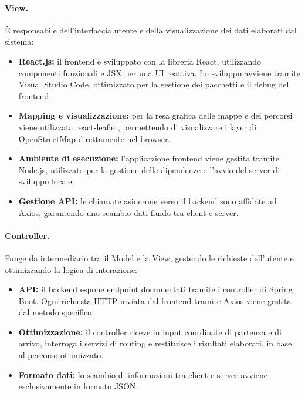 \paragraph*{\textbf{View.}} È responsabile dell'interfaccia utente e della visualizzazione dei dati elaborati dal sistema:

\begin{itemize}
    \item \textbf{React.js:} il frontend è sviluppato con la libreria React, utilizzando componenti funzionali e JSX per una UI reattiva. Lo sviluppo avviene tramite Visual Studio Code, ottimizzato per la gestione dei pacchetti e il debug del frontend.
    \item \textbf{Mapping e visualizzazione:} per la resa grafica delle mappe e dei percorsi viene utilizzata react-leaflet, permettendo di visualizzare i layer di OpenStreetMap direttamente nel browser.
    \item \textbf{Ambiente di esecuzione:} l'applicazione frontend viene gestita tramite Node.js, utilizzato per la gestione delle dipendenze e l'avvio del server di sviluppo locale.
    \item \textbf{Gestione API:} le chiamate asincrone verso il backend sono affidate ad Axios, garantendo uno scambio dati fluido tra client e server.
\end{itemize}

\paragraph*{\textbf{Controller.}} Funge da intermediario tra il Model e la View, gestendo le richieste dell'utente e ottimizzando la logica di interazione:
\begin{itemize}
    \item \textbf{API:} il backend espone endpoint documentati tramite i controller di Spring Boot. Ogni richiesta HTTP inviata dal frontend tramite Axios viene gestita dal metodo specifico.
    \item \textbf{Ottimizzazione:} il controller riceve in input coordinate di partenza e di arrivo, interroga i servizi di routing e restituisce i risultati elaborati, in base al percorso ottimizzato.
    \item \textbf{Formato dati:} lo scambio di informazioni tra client e server avviene esclusivamente in formato JSON.
\end{itemize}